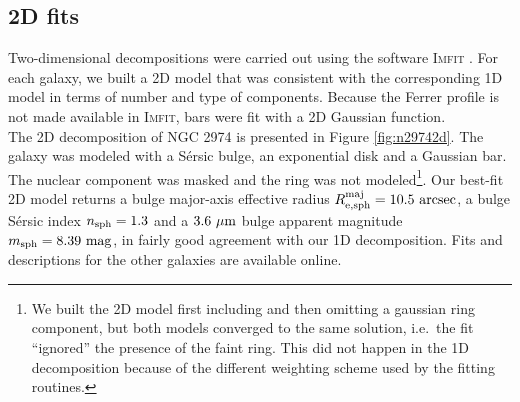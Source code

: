 \documentclass[preprint2]{emulateapj}
\newcommand{\fitfigurewidth}{0.8\textwidth}
\begin{document}
%
%

\subsection{2D fits}
\label{sec:2d}
Two-dimensional decompositions were carried out using the software \textsc{Imfit} \citep{imfit}.
For each galaxy, we built a 2D model that was consistent with the corresponding 1D model in terms of number and type of components. 
Because the Ferrer profile is not made available in \textsc{Imfit},
bars were fit with a 2D Gaussian function. \\
The 2D decomposition of NGC 2974 is presented in Figure \ref{fig:n29742d}. 
The galaxy was modeled with a S\'ersic bulge, an exponential disk and a Gaussian bar.
The nuclear component was masked and the ring was not 
modeled\footnote{We built the 2D model first including and then omitting a gaussian ring component, 
but both models converged to the same solution, i.e.~the fit ``ignored'' the presence of the faint ring. 
This did not happen in the 1D decomposition because of the different weighting scheme used by the fitting routines.}. 
Our best-fit 2D model returns a bulge major-axis effective radius $R_{\rm e,sph}^{\rm maj} = 10.5~\rm arcsec$, 
a bulge S\'ersic index $n_{\rm sph} = 1.3$ and a $3.6~\rm \mu m$ bulge apparent magnitude $m_{\rm sph} = 8.39~\rm mag$, 
in fairly good agreement with our 1D decomposition. 
Fits and descriptions for the other galaxies are available online.
\end{document}
